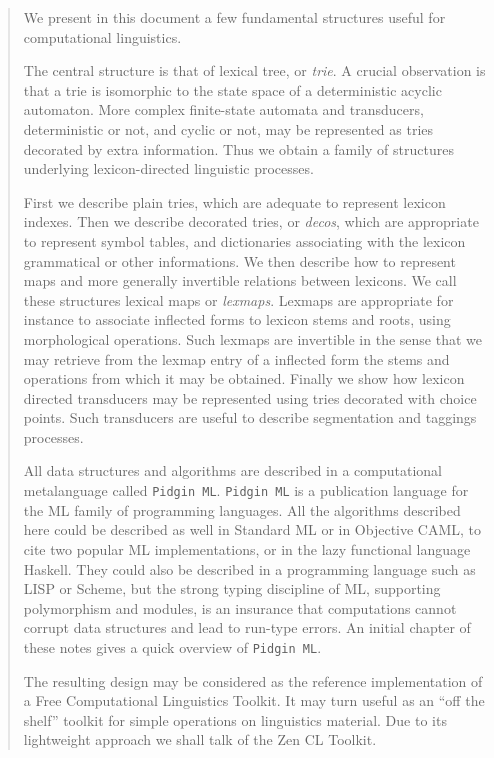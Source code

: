 \tableofcontents
\newpage
\begin{abstract}
We present in this document a few fundamental structures useful for
computational linguistics. 

The central structure is that of lexical tree, or {\sl trie}.
A crucial observation is that a trie is isomorphic to the state space
of a deterministic acyclic automaton. More complex finite-state
automata and transducers, deterministic or not, and cyclic or
not, may be represented as tries decorated by extra information. Thus we
obtain a family of structures underlying lexicon-directed linguistic
processes.

First we describe plain tries, which are adequate to represent lexicon indexes.
Then we describe decorated tries, or {\sl decos}, which are appropriate to
represent symbol tables, and dictionaries associating with the lexicon
grammatical or other informations. We then describe how to represent
maps and more generally invertible relations between lexicons. We call these
structures lexical maps or {\sl lexmaps}. Lexmaps are appropriate for instance
to associate inflected forms to lexicon stems and roots, using morphological
operations. Such lexmaps are invertible in the sense that we may retrieve
from the lexmap entry of a inflected form the stems and operations from which
it may be obtained. Finally we show how lexicon directed transducers may
be represented using tries decorated with choice points. Such transducers
are useful to describe segmentation and taggings processes.

All data structures and algorithms are described
in a computational metalanguage called \verb:Pidgin ML:. \verb:Pidgin ML: is a 
publication language for the ML family of programming languages. All the
algorithms described here could be described as well in Standard ML
or in Objective CAML, to cite two popular ML implementations, or in the
lazy functional language Haskell. They could also be described in a 
programming language such as LISP or Scheme, but the strong typing discipline
of ML, supporting polymorphism and modules, is an insurance that computations
cannot corrupt data structures and lead to run-type errors. 
An initial chapter of these notes gives a quick overview of \verb:Pidgin ML:. 

The resulting design may be considered as the reference implementation of a Free 
Computational Linguistics Toolkit. It may turn useful as an ``off the shelf''
toolkit for simple operations on linguistics material. Due to its
lightweight approach we shall talk of the Zen CL Toolkit. 


\end{abstract}
